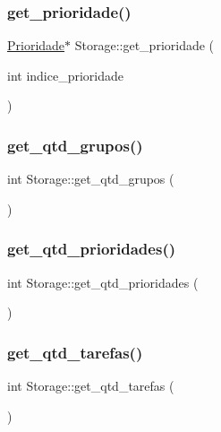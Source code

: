 \subsubsection{\texorpdfstring{get\+\_\+prioridade()}{get\_prioridade()}\hspace{0.1cm}{\footnotesize\ttfamily [2/2]}}
{\footnotesize\ttfamily \hyperlink{classPrioridade}{Prioridade}$\ast$ Storage\+::get\+\_\+prioridade (\begin{DoxyParamCaption}\item[{int}]{indice\+\_\+prioridade }\end{DoxyParamCaption})}

\mbox{\label{classStorage_ae92552f01f0e393d4168f6e159a0ca12}} 
\subsubsection{\texorpdfstring{get\+\_\+qtd\+\_\+grupos()}{get\_qtd\_grupos()}}
{\footnotesize\ttfamily int Storage\+::get\+\_\+qtd\+\_\+grupos (\begin{DoxyParamCaption}{ }\end{DoxyParamCaption})}

\mbox{\label{classStorage_a3ab42001bc5be1d4607fb5b24157c85d}} 
\subsubsection{\texorpdfstring{get\+\_\+qtd\+\_\+prioridades()}{get\_qtd\_prioridades()}}
{\footnotesize\ttfamily int Storage\+::get\+\_\+qtd\+\_\+prioridades (\begin{DoxyParamCaption}{ }\end{DoxyParamCaption})}

\mbox{\label{classStorage_aa42ca5fe247fbc390ca86c4a05346daa}} 
\subsubsection{\texorpdfstring{get\+\_\+qtd\+\_\+tarefas()}{get\_qtd\_tarefas()}}
{\footnotesize\ttfamily int Storage\+::get\+\_\+qtd\+\_\+tarefas (\begin{DoxyParamCaption}{ }\end{DoxyParamCaption})}

